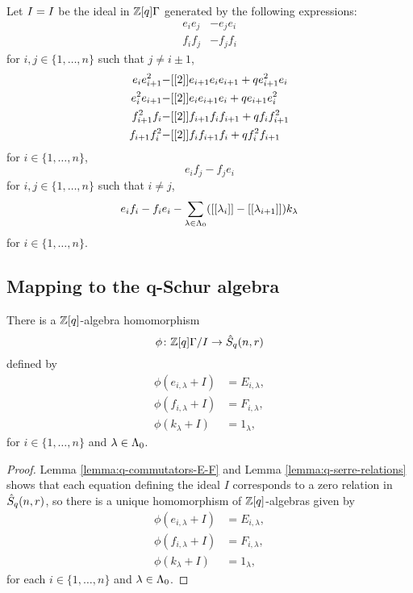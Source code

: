 \documentclass[a4paper, 11pt]{report}
\begin{document}
Let $I=\qrelations$ be the ideal in $\mathbb{Z}[q]\Gamma$ generated by the following expressions:
\begin{align*}
e_ie_j &-e_je_i\\
f_if_j &-f_jf_i
\end{align*}
for $i,j\in\{1,\ldots,n\}$ such that $j\neq i\pm 1$,
\begin{align*}
e_ie_{i+1}^2 -&[[2]]e_{i+1}e_ie_{i+1} +qe_{i+1}^2e_i\\
e_i^2e_{i+1} -&[[2]]e_ie_{i+1}e_i +qe_{i+1}e_i^2\\
f_{i+1}^2f_i -&[[2]]f_{i+1}f_if_{i+1} +qf_if_{i+1}^2\\
f_{i+1}f_i^2 -&[[2]]f_if_{i+1}f_i +qf_i^2f_{i+1}
\end{align*}
for $i\in\{1,\ldots,n\}$,
\begin{equation*}
e_if_j-f_je_i
\end{equation*}
for $i,j\in\{1,\ldots,n\}$ such that $i\neq j$,
\begin{equation*}
e_if_i-f_ie_i - \sum_{\lambda\in\Lambda_0{}}([[\lambda_i]]-[[\lambda_{i+1}]])k_\lambda
\end{equation*}
for $i\in\{1,\ldots,n\}$.

\renewcommand{\qrelations}{I}


\subsection{Mapping to the q-Schur algebra}

\begin{lemma}
There is a $\mathbb{Z}[q]$-algebra homomorphism
\begin{equation*}
\phi\colon\integers[q]\Gamma/\qrelations \to\qschur
\end{equation*}
defined by
\begin{align*}
\phi(e_{i,\lambda} +\qrelations) &= E_{i,\lambda},\\
\phi(f_{i,\lambda} +\qrelations) &= F_{i,\lambda},\\
\phi(k_\lambda +\qrelations) &= 1_\lambda,
\end{align*}
for $i\in\{1,\ldots,n\}$ and $\lambda\in\Lambda_0{}$.
\end{lemma}

\begin{proof}
Lemma \ref{lemma:q-commutators-E-F} and Lemma \ref{lemma:q-serre-relations} shows that each equation defining the ideal $\qrelations$ corresponds to a zero relation in $\hat{S}_q(n,r)$, so there is a unique homomorphism of $\mathbb{Z}[q]$-algebras given by
\begin{align*}
\phi(e_{i,\lambda} +\qrelations) &= E_{i,\lambda},\\
\phi(f_{i,\lambda} +\qrelations) &= F_{i,\lambda},\\
\phi(k_\lambda +\qrelations) &= 1_\lambda,
\end{align*}
for each $i\in\{1,\ldots,n\}$ and $\lambda\in\Lambda_0{}$.
\end{proof}
\end{document}

